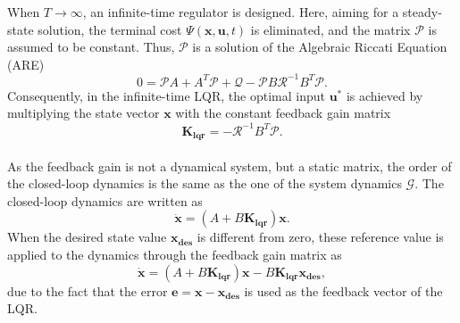 When $T \to \infty$, an infinite-time regulator is designed. Here, aiming for a steady-state solution, the terminal cost $\Psi(\mathbf{x}, \mathbf{u},t)$ is eliminated, and the matrix $\mathcal{P}$ is assumed to be constant. Thus, $\mathcal{P}$ is a solution of the Algebraic Riccati Equation (ARE)
	\begin{equation}
	0 = \mathcal{P}A + A^{T}\mathcal{P} + \mathcal{Q} - \mathcal{P}B\mathcal{R}^{-1}B^{T}\mathcal{P}.
	\end{equation}
Consequently, in the infinite-time LQR, the optimal input $\mathbf{u}^{*}$ is achieved by multiplying the state vector $\mathbf{x}$ with the constant feedback gain matrix
\begin{equation}
\mathbf{K_{lqr}} = -\mathcal{R}^{-1}B^{T}\mathcal{P}.
\end{equation}
\\As the feedback gain is not a dynamical system, but a static matrix, the order of the closed-loop dynamics is the same as the one of the system dynamics $\mathcal{G}$. The closed-loop dynamics are written as
\begin{equation}
\dot{\mathbf{x}} = (A+B\mathbf{K_{lqr}})\mathbf{x}.
\end{equation}
When the desired state value $\mathbf{x_{des}}$ is different from zero, these reference value is applied to the dynamics through the feedback gain matrix as
\begin{equation}
\dot{\mathbf{x}} = (A+B\mathbf{K_{lqr}})\mathbf{x}-B\mathbf{K_{lqr}}\mathbf{x_{des}},
\end{equation}
due to the fact that the error $\mathbf{e} = \mathbf{x} - \mathbf{x_{des}}$ is used as the feedback vector of the LQR.


